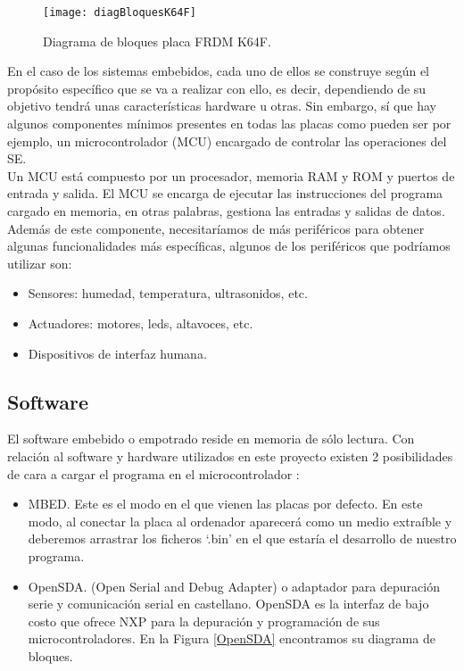 \begin{figure}[!h]
	\centering
	\texttt{[image: diagBloquesK64F]}
	\caption{Diagrama de bloques placa FRDM K64F.}\label{diagBloquesK64F}
\end{figure}

En el caso de los sistemas embebidos, cada uno de ellos se construye según el propósito específico que se va a realizar con ello, es decir, dependiendo de su objetivo tendrá unas características hardware u otras. Sin embargo, sí que hay algunos componentes mínimos presentes en todas las placas como pueden ser por ejemplo, un microcontrolador (MCU) encargado de controlar las operaciones del SE. \\
Un MCU está compuesto por un procesador, memoria RAM y ROM y puertos de entrada y salida. El MCU se encarga de ejecutar las instrucciones del programa cargado en memoria, en otras palabras, gestiona las entradas y salidas de datos. Además de este componente, necesitaríamos de más periféricos para obtener algunas funcionalidades más específicas, algunos de los periféricos que podríamos utilizar son:

\begin{itemize}
\item Sensores: humedad, temperatura, ultrasonidos, etc.
\item Actuadores: motores, leds, altavoces, etc.
\item Dispositivos de interfaz humana.
\end{itemize}


\subsection{Software}

El software embebido o empotrado reside en memoria de sólo lectura. Con relación al software y hardware utilizados en este proyecto existen 2 posibilidades de cara a cargar el programa en el microcontrolador \cite{embos}:
\begin{itemize}
\item MBED. Este es el modo en el que vienen las placas por defecto. En este modo, al conectar la placa al ordenador aparecerá como un medio extraíble y deberemos arrastrar los ficheros `.bin' en el que estaría el desarrollo de nuestro programa.
\item OpenSDA. (Open Serial and Debug Adapter) o adaptador para depuración serie y comunicación serial en castellano. OpenSDA es la interfaz de bajo costo que ofrece NXP para la depuración y programación de sus microcontroladores. En la Figura \ref{OpenSDA} encontramos su diagrama de bloques.
\end{itemize}

